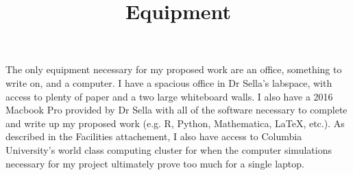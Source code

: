 \documentclass[11pt]{article}
\title{Equipment}
\date{}
\begin{document}
\maketitle

The only equipment necessary for my proposed work are an office, something to write on, and a computer. I have a spacious office in Dr Sella's labspace, with access to plenty of paper and a two large whiteboard walls. I also have a 2016 Macbook Pro provided by Dr Sella with all of the software necessary to complete and write up my proposed work (e.g. R, Python, Mathematica, LaTeX, etc.). As described in the Facilities attachement, I also have access to Columbia University's world class computing cluster for when the computer simulations necessary for my project ultimately prove too much for a single laptop.
\end{document}
